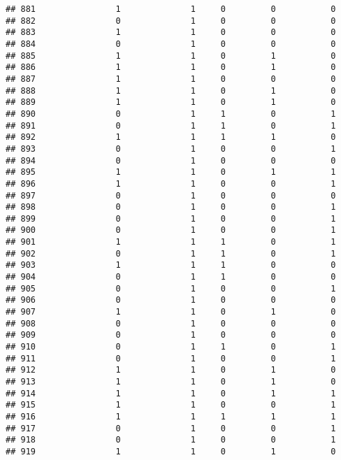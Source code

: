 \documentclass[]{article}
\begin{document}
\begin{verbatim}
## 881                1              1     0         0           0
## 882                0              1     0         0           0
## 883                1              1     0         0           0
## 884                0              1     0         0           0
## 885                1              1     0         1           0
## 886                1              1     0         1           0
## 887                1              1     0         0           0
## 888                1              1     0         1           0
## 889                1              1     0         1           0
## 890                0              1     1         0           1
## 891                0              1     1         0           1
## 892                1              1     1         1           0
## 893                0              1     0         0           1
## 894                0              1     0         0           0
## 895                1              1     0         1           1
## 896                1              1     0         0           1
## 897                0              1     0         0           0
## 898                0              1     0         0           1
## 899                0              1     0         0           1
## 900                0              1     0         0           1
## 901                1              1     1         0           1
## 902                0              1     1         0           1
## 903                1              1     1         0           0
## 904                0              1     1         0           0
## 905                0              1     0         0           1
## 906                0              1     0         0           0
## 907                1              1     0         1           0
## 908                0              1     0         0           0
## 909                0              1     0         0           0
## 910                0              1     1         0           1
## 911                0              1     0         0           1
## 912                1              1     0         1           0
## 913                1              1     0         1           0
## 914                1              1     0         1           1
## 915                1              1     0         0           1
## 916                1              1     1         1           1
## 917                0              1     0         0           1
## 918                0              1     0         0           1
## 919                1              1     0         1           0

\end{verbatim}
\end{document}
